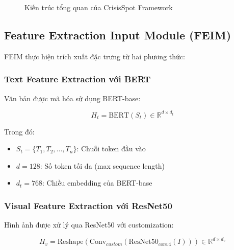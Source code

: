 \documentclass[12pt,a4paper]{article}
\begin{document}
\begin{figure}[H]
\caption{Kiến trúc tổng quan của CrisisSpot Framework}
\label{fig:architecture}
\end{figure}

\subsection{Feature Extraction Input Module (FEIM)}

FEIM thực hiện trích xuất đặc trưng từ hai phương thức:

\subsubsection{Text Feature Extraction với BERT}

Văn bản được mã hóa sử dụng BERT-base:

\begin{equation}
H_t = \text{BERT}(S_t) \in \mathbb{R}^{d \times d_t}
\end{equation}

Trong đó:
\begin{itemize}
    \item $S_t = \{T_1, T_2, ..., T_n\}$: Chuỗi token đầu vào
    \item $d = 128$: Số token tối đa (max sequence length)
    \item $d_t = 768$: Chiều embedding của BERT-base
\end{itemize}

\subsubsection{Visual Feature Extraction với ResNet50}

Hình ảnh được xử lý qua ResNet50 với customization:

\begin{equation}
H_v = \text{Reshape}(\text{Conv}_{custom}(\text{ResNet50}_{conv4}(I))) \in \mathbb{R}^{d \times d_v}
\end{equation}
\end{document}
